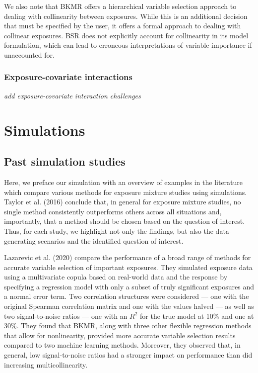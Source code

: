\documentclass[12pt, twoside]{amherstthesis}
\begin{document}
We also note that BKMR offers a hierarchical variable selection approach to dealing with collinearity between exposures. While this is an additional decision that must be specified by the user, it offers a formal approach to dealing with collinear exposures. BSR does not explicitly account for collinearity in its model formulation, which can lead to erroneous interpretations of variable importance if unaccounted for.

\hypertarget{exposure-covariate-interactions}{%
\subsection{Exposure-covariate interactions}\label{exposure-covariate-interactions}}

\emph{add exposure-covariate interaction challenges}

\hypertarget{sims}{%
\chapter{Simulations}\label{sims}}

\hypertarget{past-simulation-studies}{%
\section{Past simulation studies}\label{past-simulation-studies}}

Here, we preface our simulation with an overview of examples in the literature which compare various methods for exposure mixture studies using simulations. Taylor et al. (2016) conclude that, in general for exposure mixture studies, no single method consistently outperforms others across all situations and, importantly, that a method should be chosen based on the question of interest. Thus, for each study, we highlight not only the findings, but also the data-generating scenarios and the identified question of interest.

Lazarevic et al. (2020) compare the performance of a broad range of methods for accurate variable selection of important exposures. They simulated exposure data using a multivariate copula based on real-world data and the response by specifying a regression model with only a subset of truly significant exposures and a normal error term. Two correlation structures were considered --- one with the original Spearman correlation matrix and one with the values halved --- as well as two signal-to-noise ratios --- one with an \(R^2\) for the true model at 10\% and one at 30\%. They found that BKMR, along with three other flexible regression methods that allow for nonlinearity, provided more accurate variable selection results compared to two machine learning methods. Moreover, they observed that, in general, low signal-to-noise ratios had a stronger impact on performance than did increasing multicollinearity.
\end{document}
